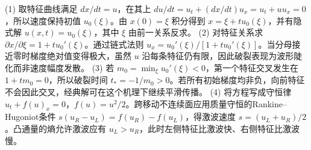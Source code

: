 (1) 取特征曲线满足 \(dx/dt=u\)，在其上 \(du/dt=u_t+(dx/dt)u_x=u_t+uu_x=0\)，所以速度保持初值 \(u_0(\xi)\)。由 \(x(0)=\xi\) 积分得到 \(x=\xi+t u_0(\xi)\)，并有隐式解 \(u(x,t)=u_0(\xi)\)，其中 \(\xi\) 由前一关系反求。
(2) 对特征关系求 \(\partial x/\partial\xi=1+t u_0'(\xi)\)。通过链式法则 \(u_x=u_0'(\xi)/[1+t u_0'(\xi)]\)。当分母接近零时梯度绝对值变得极大，虽然 \(u\) 沿每条特征仍有限，因此破裂表现为波形陡化而非速度幅度发散。
(3) 若 \(m_0=\min_\xi u_0'(\xi)<0\)，第一个特征交叉发生在 \(1+t m_0=0\)，所以破裂时间 \(t_*=-1/m_0>0\)。若所有初始梯度均非负，向前特征不会因此交叉，经典解可在这个机理下继续平滑传播。
(4) 将方程写成守恒律 \(u_t+f(u)_x=0\)，\(f(u)=u^2/2\)。跨移动不连续面应用质量守恒的Rankine–Hugoniot条件 \(s(u_R-u_L)=f(u_R)-f(u_L)\)，得激波速度 \(s=(u_L+u_R)/2\)。凸通量的熵允许激波应有 \(u_L>u_R\)，此时左侧特征比激波快、右侧特征比激波慢。
